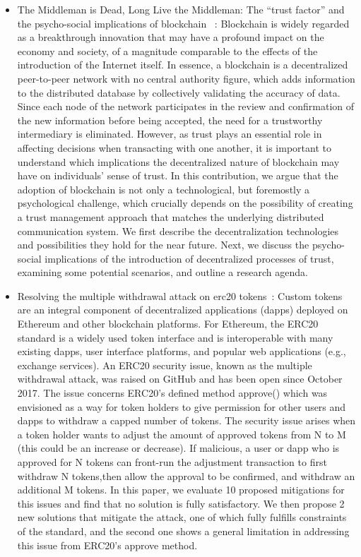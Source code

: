 \begin{itemize}

    \item{The Middleman is Dead, Long Live the Middleman: The “trust factor” and the psycho-social implications of blockchain ~\cite{gaggioli2019middleman}}: Blockchain is widely regarded as a breakthrough innovation that may have a profound impact on the economy and society, of a magnitude comparable to the effects of the introduction of the Internet itself. In essence, a blockchain is a decentralized peer-to-peer network with no central authority figure, which adds information to the distributed database by collectively validating the accuracy of data. Since each node of the network participates in the review and confirmation of the new information before being accepted, the need for a trustworthy intermediary is eliminated. However, as trust plays an essential role in affecting decisions when transacting with one another, it is important to understand which implications the decentralized nature of blockchain may have on individuals' sense of trust. In this contribution, we argue that the adoption of blockchain is not only a technological, but foremostly a psychological challenge, which crucially depends on the possibility of creating a trust management approach that matches the underlying distributed communication system. We first describe the decentralization technologies and possibilities they hold for the near future. Next, we discuss the psycho-social implications of the introduction of decentralized processes of trust, examining some potential scenarios, and outline a research agenda.

    \item{Resolving the multiple withdrawal attack on erc20 tokens~\cite{rahimian2019resolving}:} Custom tokens are an integral component of decentralized applications (dapps) deployed on Ethereum and other blockchain platforms. For Ethereum, the ERC20 standard is a widely used token interface and is interoperable with many existing dapps, user interface platforms, and popular web applications (e.g., exchange services). An ERC20 security issue, known as the multiple withdrawal attack, was raised on GitHub and has been open since October 2017. The issue concerns ERC20's defined method approve() which was envisioned as a way for token holders to give permission for other users and dapps to withdraw a capped number of tokens. The security issue arises when a token holder wants to adjust the amount of approved tokens from N to M (this could be an increase or decrease). If malicious, a user or dapp who is approved for N tokens can front-run the adjustment transaction to first withdraw N tokens,then allow the approval to be confirmed, and withdraw an additional M tokens. In this paper, we evaluate 10 proposed mitigations for this issues and find that no solution is fully satisfactory. We then propose 2 new solutions that mitigate the attack, one of which fully fulfills constraints of the standard, and the second one shows a general limitation in addressing this issue from ERC20’s approve method.



\end{itemize}
